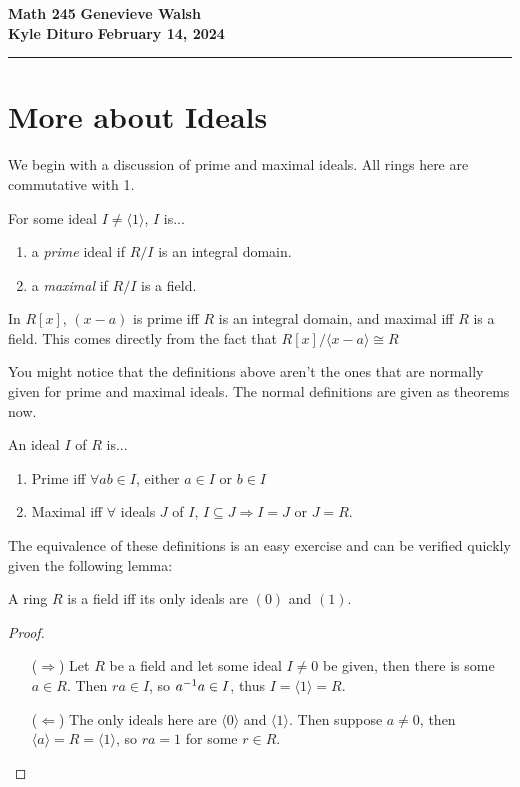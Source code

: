 \documentclass[12pt, twosided]{article}
\begin{document}
\noindent \textbf{Math 245} \hfill \textbf{Genevieve Walsh} \\
\textbf{Kyle Dituro} \hfill \textbf{February 14\tht, 2024}\hrule
\vspace{.2in}

\section{More about Ideals}
We begin with a discussion of prime and maximal ideals. All rings here are commutative with 1.

\begin{df}\label{MaxPrimeDf}
  For some ideal \(I \neq \langle 1 \rangle\), \(I\) is...
  \begin{enumerate}
  \item a \textit{prime} ideal if \(R/I\) is an integral domain.
  \item a \textit{maximal} if \(R/I\) is a field.
  \end{enumerate}
\end{df}

\begin{exa}
  In \(R[x]\), \((x-a)\) is prime iff \(R\) is an integral domain, and maximal iff \(R\) is a field. This comes directly from the fact that \(R[x]/\langle x-a \rangle \cong R\)
\end{exa}

You might notice that the definitions above aren't the ones that are normally given for prime and maximal ideals. The normal definitions are given as theorems now.

\begin{thm}\label{MaxPrimeThm}
  An ideal \(I\) of \(R\) is...
  \begin{enumerate}
  \item Prime iff \(\forall ab \in I\), either \(a\in I\) or \(b \in I\)
  \item Maximal iff \(\forall\) ideals \(J\) of \(I\), \(I \subseteq J \Rightarrow I = J\) or \(J = R\).
  \end{enumerate}

\end{thm}

The equivalence of these definitions is an easy exercise and can be verified quickly given the following lemma:

\begin{lm}
  A ring \(R\) is a field iff its only ideals are \((0)\) and \((1)\).
\end{lm}
\begin{proof}
  \begin{enumerate}
  \item [(\(\Rightarrow\))] Let \(R\) be a field and let some ideal \(I \neq 0\) be given, then there is some \(a \in R\). Then \(ra \in I\), so \(a^{-1}a \in I\), thus \(I = \langle 1 \rangle = R\).
  \item [(\(\Leftarrow\))] The only ideals here are \(\langle 0 \rangle\) and \(\langle 1 \rangle\). Then suppose \(a \neq 0\), then \(\langle a \rangle = R = \langle 1 \rangle\), so \(ra = 1\) for some \(r \in R\).
  \end{enumerate}
\end{proof}
\end{document}
